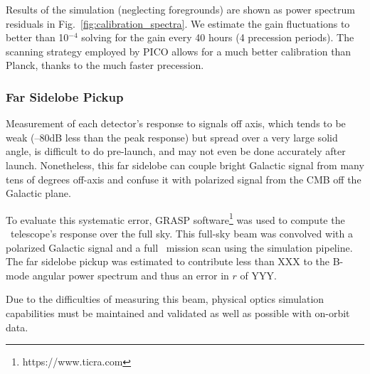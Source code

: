 \documentclass[PICOReport.tex]{subfiles}
\begin{document}
Results of the simulation (neglecting foregrounds) are shown as power spectrum residuals in Fig.~\ref{fig:calibration_spectra}. 
We estimate the gain fluctuations to better than 10$^{-4}$ solving for the gain every 40 hours (4 precession periods).
The scanning strategy employed by PICO allows for a much better calibration than Planck, thanks to the much faster precession.

\subsubsection{Far Sidelobe Pickup}
\label{sec:fsl}
Measurement of each detector's response to signals off axis, which tends to be weak (--80dB less than the peak response) but spread over a very large solid angle, is difficult to do pre-launch, and may not even be done accurately after launch.  Nonetheless, this far sidelobe can couple bright Galactic signal from many tens of degrees off-axis and confuse it with polarized signal from the CMB off the Galactic plane.  

To evaluate this systematic error, GRASP software\footnote{https://www.ticra.com} was used to compute the \pico\ telescope's response over the full sky.  This full-sky beam was convolved with a polarized Galactic signal and a full \pico\ mission scan using the simulation pipeline.  The far sidelobe pickup was estimated to contribute less than XXX to the B-mode angular power spectrum and thus an error in $r$ of YYY.

Due to the difficulties of measuring this beam, physical optics simulation capabilities must be maintained and validated as well as possible with on-orbit data.
\end{document}
